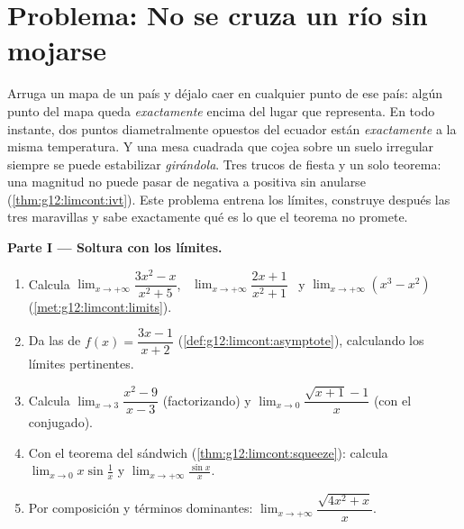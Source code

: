 \section{Problema: No se cruza un río sin mojarse}

\begin{problem}
\label{pb:g12:limcont:1}
Arruga un mapa de un país y déjalo caer en cualquier punto de ese país:
algún punto del mapa queda \emph{exactamente} encima del lugar que
representa. En todo instante, dos puntos diametralmente opuestos del
ecuador están \emph{exactamente} a la misma temperatura. Y una mesa
cuadrada que cojea sobre un suelo irregular siempre se puede estabilizar
\emph{girándola}. Tres trucos de fiesta y un solo teorema: una magnitud
 no puede pasar de negativa a positiva sin anularse
(\cref{thm:g12:limcont:ivt}). Este problema entrena los límites, construye
después las tres maravillas y sabe exactamente qué es lo que el teorema no
promete.

\medskip
\noindent\textbf{Parte I --- Soltura con los límites.}
\begin{enumerate}
  \item Calcula $\lim_{x \to +\infty} \dfrac{3x^2 - x}{x^2 + 5}$, \
        $\lim_{x \to +\infty} \dfrac{2x + 1}{x^2 + 1}$ \ y
        $\lim_{x \to +\infty} (x^3 - x^2)$
        (\cref{met:g12:limcont:limits}).
  \item Da las  de $f(x) = \dfrac{3x - 1}{x + 2}$
        (\cref{def:g12:limcont:asymptote}), calculando los límites
        pertinentes.
  \item Calcula $\lim_{x \to 3} \dfrac{x^2 - 9}{x - 3}$ (factorizando) y
        $\lim_{x \to 0} \dfrac{\sqrt{x + 1} - 1}{x}$ (con el conjugado).
  \item Con el teorema del sándwich (\cref{thm:g12:limcont:squeeze}):
        calcula $\lim_{x \to 0} x \sin\frac1x$ y
        $\lim_{x \to +\infty} \frac{\sin x}{x}$.
  \item Por composición y términos dominantes:
        $\lim_{x \to +\infty} \dfrac{\sqrt{4x^2 + x}}{x}$.
\end{enumerate}


\end{problem}
